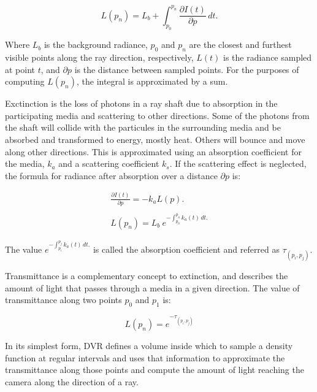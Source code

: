 \documentclass[oneside,a4paper,english,links]{amca}
\begin{document}
\begin{equation} \label{eq:general_radiance}  
L(p_n) = L_b + \int_{p_0}^{p_n} \frac{\partial I(t)}{\partial p} \, dt.
\end{equation}

Where $L_b$ is the background radiance, $p_0$ and $p_n$ are the
closest and furthest visible points along the ray direction,
respectively, $L(t)$ is the radiance sampled at point $t$, and
$\partial p$ is the distance between sampled points. For the purposes
of computing $L(p_n)$, the integral is approximated by a sum.

Exctinction is the loss of photons in a ray shaft due to absorption in
the participating media and scattering to other directions. Some of
the photons from the shaft will collide with the particules in the
surrounding media and be absorbed and transformed to energy, mostly
heat. Others will bounce and move along other directions. This is
approximated using an absorption coefficient for the media, $k_a$ and
a scattering coefficient $k_s$. If the scattering effect is neglected,
the formula for radiance after absorption over a distance $\partial p$
is:

\begin{equation} \label{eq:absorption_radiance}  
\begin{aligned}
\frac{\partial I(t)}{\partial p} = -k_a L(p). 
\\
\\
L(p_n) = L_b \ e^{-\int_{p_0}^{p_n} k_a(t) \, dt.}
\end{aligned}
\end{equation}

The value $e^{-\int_{p_i}^{p_j} k_a(t) \, dt.}$ is called the
absorption coefficient and referred as $\tau_{(p_i, p_j)}$.

Transmittance is a complementary concept to extinction, and describes
the amount of light that passes through a media in a given
direction. The value of transmittance along two points $p_0$ and $p_1$
is:

\begin{equation} \label{eq:general_radiance}  
L(p_n) = e^{-\tau_{(p_i, p_j)}}
\end{equation}

In its simplest form, DVR defines a volume inside which to sample a
density function at regular intervals and uses that information to
approximate the transmittance along those points and compute the
amount of light reaching the camera along the direction of a ray.
\end{document}
